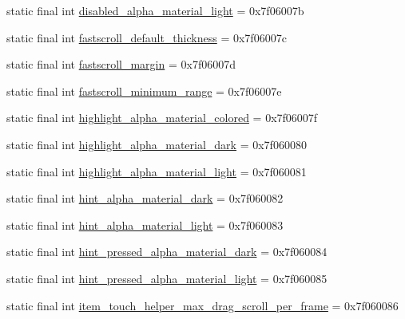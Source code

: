 \begin{DoxyCompactItemize}
static final int \mbox{\hyperlink{classcom_1_1synnapps_1_1carouselview_1_1_r_1_1dimen_a2bc37c3a6e42ba0a7bb3d24bfce58204}{disabled\+\_\+alpha\+\_\+material\+\_\+light}} = 0x7f06007b
\item 
static final int \mbox{\hyperlink{classcom_1_1synnapps_1_1carouselview_1_1_r_1_1dimen_a9e236d77e72abb5f5c6045d804898869}{fastscroll\+\_\+default\+\_\+thickness}} = 0x7f06007c
\item 
static final int \mbox{\hyperlink{classcom_1_1synnapps_1_1carouselview_1_1_r_1_1dimen_ac94c2c9204729e811a91e5d41ab9be7d}{fastscroll\+\_\+margin}} = 0x7f06007d
\item 
static final int \mbox{\hyperlink{classcom_1_1synnapps_1_1carouselview_1_1_r_1_1dimen_a1427200d43fe16dd97b715709def726c}{fastscroll\+\_\+minimum\+\_\+range}} = 0x7f06007e
\item 
static final int \mbox{\hyperlink{classcom_1_1synnapps_1_1carouselview_1_1_r_1_1dimen_a785aed2a258963a416cd66b1f5c8fba2}{highlight\+\_\+alpha\+\_\+material\+\_\+colored}} = 0x7f06007f
\item 
static final int \mbox{\hyperlink{classcom_1_1synnapps_1_1carouselview_1_1_r_1_1dimen_acc306ab3d84707980108dfe8c0188a7c}{highlight\+\_\+alpha\+\_\+material\+\_\+dark}} = 0x7f060080
\item 
static final int \mbox{\hyperlink{classcom_1_1synnapps_1_1carouselview_1_1_r_1_1dimen_a3b1269f284fd8ba3e94cfc7c69be0d88}{highlight\+\_\+alpha\+\_\+material\+\_\+light}} = 0x7f060081
\item 
static final int \mbox{\hyperlink{classcom_1_1synnapps_1_1carouselview_1_1_r_1_1dimen_ae79da72f9a447df7ec300c7dc5daa024}{hint\+\_\+alpha\+\_\+material\+\_\+dark}} = 0x7f060082
\item 
static final int \mbox{\hyperlink{classcom_1_1synnapps_1_1carouselview_1_1_r_1_1dimen_afcf87b23622979b393788f178100b005}{hint\+\_\+alpha\+\_\+material\+\_\+light}} = 0x7f060083
\item 
static final int \mbox{\hyperlink{classcom_1_1synnapps_1_1carouselview_1_1_r_1_1dimen_a0a4e8d0d08680e96dad7ac95c843b126}{hint\+\_\+pressed\+\_\+alpha\+\_\+material\+\_\+dark}} = 0x7f060084
\item 
static final int \mbox{\hyperlink{classcom_1_1synnapps_1_1carouselview_1_1_r_1_1dimen_a41b6de4edad371aa054ecb3445e5fef6}{hint\+\_\+pressed\+\_\+alpha\+\_\+material\+\_\+light}} = 0x7f060085
\item 
static final int \mbox{\hyperlink{classcom_1_1synnapps_1_1carouselview_1_1_r_1_1dimen_abf4308234027ae18abd885756e39b226}{item\+\_\+touch\+\_\+helper\+\_\+max\+\_\+drag\+\_\+scroll\+\_\+per\+\_\+frame}} = 0x7f060086

\end{DoxyCompactItemize}
